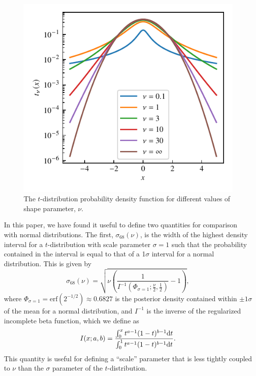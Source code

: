 \documentclass[fleqn,usenatbib]{rasti}
\begin{document}
\begin{figure}
	\includegraphics{graphics/t-dist-log.pdf}
    \caption{The $t$-distribution probability density function for different
    values of shape parameter, $\nu$.}
    \label{fig:model.t}
\end{figure}

In this paper, we have found it useful to define two quantities for comparison
with normal distributions. The first, $\sigma_{68}(\nu)$, is the width of the
highest density interval for a $t$-distribution with scale parameter $\sigma =
1$ such that the probability contained in the interval is equal to that of a
1$\sigma$ interval for a normal distribution. This is given by
\begin{equation}
    \sigma_{68}(\nu) =
        \sqrt{
            \nu \left(
                \frac{1}{I^{-1}(\Phi_{\sigma=1};\frac\nu2, \frac12)} - 1
            \right)
        },
    \label{eqn:model.sigma_68}
\end{equation}
where $\Phi_{\sigma=1} = \text{erf}(2^{-1/2}) \approx 0.6827$ is the posterior
density contained within $\pm1\sigma$ of the mean for a normal distribution, and
$I^{-1}$ is the inverse of the regularized incomplete beta function, which we
define as
\begin{equation}
    I(x; a, b) = \frac{
        \int_0^x t^{a-1} (1 - t)^{b-1} {\rm d}t
    }{
        \int_0^1 t^{a-1} (1 - t)^{b-1} {\rm d}t
    }.
\end{equation}
This quantity is useful for defining a ``scale'' parameter that is less tightly
coupled to $\nu$ than the $\sigma$ parameter of the $t$-distribution.
\end{document}

